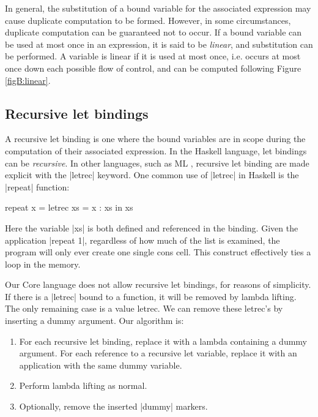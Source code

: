 In general, the substitution of a bound variable for the associated expression may cause duplicate computation to be formed. However, in some circumstances, duplicate computation can be guaranteed not to occur. If a bound variable can be used at most once in an expression, it is said to be \textit{linear}, and substitution can be performed. A variable is linear if it is used at most once, i.e. occurs at most once down each possible flow of control, and can be computed following Figure \ref{figB:linear}.

\subsection{Recursive let bindings}

A recursive let binding is one where the bound variables are in scope during the computation of their associated expression. In the Haskell language, let bindings can be \textit{recursive}. In other languages, such as ML \cite{ml}, recursive let binding are made explicit with the |letrec| keyword. One common use of |letrec| in Haskell is the |repeat| function:

\begin{example}
\label{exB:repeat}
\ignore\begin{code}
repeat x =  letrec xs = x : xs
            in xs
\end{code}

Here the variable |xs| is both defined and referenced in the binding. Given the application |repeat 1|, regardless of how much of the list is examined, the program will only ever create one single cons cell. This construct effectively ties a loop in the memory.
\end{example}

Our Core language does not allow recursive let bindings, for reasons of simplicity. If there is a |letrec| bound to a function, it will be removed by lambda lifting. The only remaining case is a value letrec. We can remove these letrec's by inserting a dummy argument. Our algorithm is:

\begin{enumerate}
\item For each recursive let binding, replace it with a lambda containing a dummy argument. For each reference to a recursive let variable, replace it with an application with the same dummy variable.
\item Perform lambda lifting as normal.
\item Optionally, remove the inserted |dummy| markers.
\end{enumerate}

